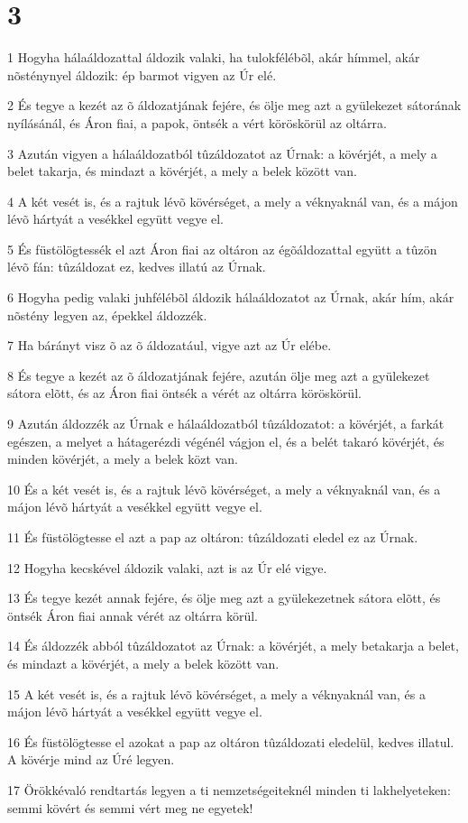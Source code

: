 \chapter{3}

\par 1 Hogyha hálaáldozattal áldozik valaki, ha tulokfélébõl, akár hímmel, akár nõsténynyel áldozik: ép barmot vigyen az Úr elé.
\par 2 És tegye a kezét az õ áldozatjának fejére, és ölje meg azt a gyülekezet sátorának nyílásánál, és Áron fiai, a papok, öntsék a vért köröskörül az oltárra.
\par 3 Azután vigyen a hálaáldozatból tûzáldozatot az Úrnak: a kövérjét, a mely a belet takarja, és mindazt a kövérjét, a mely a belek között van.
\par 4 A két vesét is, és a rajtuk lévõ kövérséget, a mely a véknyaknál van, és a májon lévõ hártyát a vesékkel együtt vegye el.
\par 5 És füstölögtessék el azt Áron fiai az oltáron az égõáldozattal együtt a tûzön lévõ fán: tûzáldozat ez, kedves illatú az Úrnak.
\par 6 Hogyha pedig valaki juhfélébõl áldozik hálaáldozatot az Úrnak, akár hím, akár nõstény legyen az, épekkel áldozzék.
\par 7 Ha bárányt visz õ az õ áldozatául, vigye azt az Úr elébe.
\par 8 És tegye a kezét az õ áldozatjának fejére, azután ölje meg azt a gyülekezet sátora elõtt, és az Áron fiai öntsék a vérét az oltárra köröskörül.
\par 9 Azután áldozzék az Úrnak e hálaáldozatból tûzáldozatot: a kövérjét, a farkát egészen, a melyet a hátagerézdi végénél vágjon el, és a belét takaró kövérjét, és minden kövérjét, a mely a belek közt van.
\par 10 És a két vesét is, és a rajtuk lévõ kövérséget, a mely a véknyaknál van, és a májon lévõ hártyát a vesékkel együtt vegye el.
\par 11 És füstölögtesse el azt a pap az oltáron: tûzáldozati eledel ez az Úrnak.
\par 12 Hogyha kecskével áldozik valaki, azt is az Úr elé vigye.
\par 13 És tegye kezét annak fejére, és ölje meg azt a gyülekezetnek sátora elõtt, és öntsék Áron fiai annak vérét az oltárra körül.
\par 14 És áldozzék abból tûzáldozatot az Úrnak: a kövérjét, a mely betakarja a belet, és mindazt a kövérjét, a mely a belek között van.
\par 15 A két vesét is, és a rajtuk lévõ kövérséget, a mely a véknyaknál van, és a májon lévõ hártyát a vesékkel együtt vegye el.
\par 16 És füstölögtesse el azokat a pap az oltáron tûzáldozati eledelül, kedves illatul. A kövérje mind az Úré legyen.
\par 17 Örökkévaló rendtartás legyen a ti nemzetségeiteknél minden ti lakhelyeteken: semmi kövért és semmi vért meg ne egyetek!

